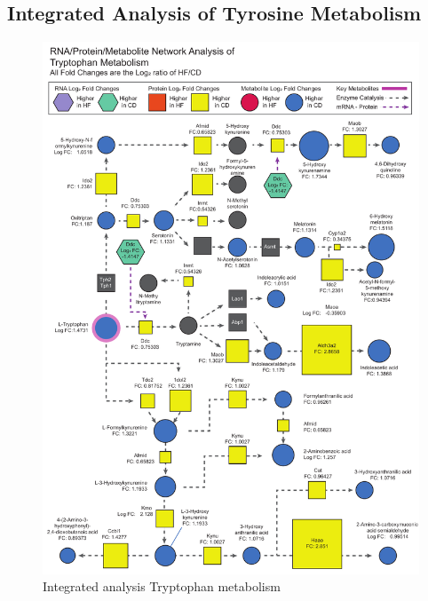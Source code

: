 \documentclass[a4paper,11pt,twoside]{book}
\begin{document}
	
	\subsection{Integrated Analysis of Tyrosine Metabolism}
	\begin{figure}
		\centering
		\includegraphics[width=1.1\linewidth]{3.Trancriptomics/Integrated_Tyrosine_protein}
		\caption{Integrated analysis Tryptophan metabolism}
		\label{fig:integratedtyrosineprotein}
	\end{figure}
	
\end{document}
